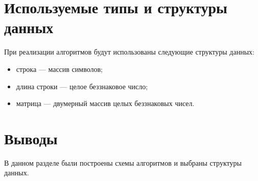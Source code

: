 \clearpage

\section{Используемые типы и структуры данных}

При реализации алгоритмов будут использованы следующие структуры данных:

\begin{itemize}
	\item строка --- массив символов;
	\item длина строки --- целое беззнаковое число;
	\item матрица --- двумерный массив целых беззнаковых чисел.
\end{itemize}

\section{Выводы}

В данном разделе были построены схемы алгоритмов и выбраны структуры данных.

